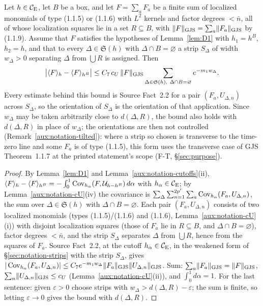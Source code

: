 \begin{auxlemma}\label{aux:constants-comparison}
Let $h\in\mathcal{C}_{\mathrm E}$, let $B$ be a box, and let $F=\sum_{a}F_a$ be a finite sum of localized
monomials of type (1.1.5) or (1.1.6) with $L^2$ kernels and factor degrees $<\bar n$, all of
whose localization squares lie in a set $R\subseteq B$, with $\lVert F\rVert_{\mathrm{GJS}}=\sum_a\lVert F_a\rVert_{\mathrm{GJS}}$ by
(1.1.9).  Assume that $F$ satisfies the hypotheses of Lemma~\ref{lem:D1} with $h_1=h^B$,
$h_2=h$, and that to every $\Delta\in\mathfrak S(h)$ with $\Delta\cap B=\varnothing$ a strip
$S_\Delta$ of width $w_\Delta>0$ separating $\Delta$ from $\bigcup R$ is assigned.  Then
\[
 \bigl|\ev Fh-\ev F{h^B}\bigr|\le C_7\,c_U\,\GJS F\sum_{\Delta\in\mathfrak S(h),\ \Delta\cap
 B=\varnothing}e^{-m_1w_\Delta} .
\]
Every estimate behind this bound is Source Fact~2.2 for a pair $(F_a,U_{\Delta,n})$ across
$S_\Delta$, so the orientation of $S_\Delta$ is the orientation of that application.  Since
$w_\Delta$ may be taken arbitrarily close to $d(\Delta,R)$, the bound also holds with
$d(\Delta,R)$ in place of $w_\Delta$; the orientations are then not controlled
(Remark~\ref{aux:notation-tilted}): where a strip so chosen is transverse to the time-zero line
and some $F_a$ is of type (1.1.5), this form uses the transverse case of GJS Theorem~1.1.7 at the
printed statement's scope (F-T, \S\ref{sec:purpose}).
\end{auxlemma}

\begin{proof}
By Lemma~\ref{lem:D1} and Lemma~\ref{aux:notation-cutoffs}(ii),
$\langle F\rangle_{h}-\langle F\rangle_{h^B}=-\int_0^1\operatorname{Cov}_{h_\alpha}(F,\mathcal U_{h-h^B})\,d\alpha$ with $h_\alpha\in\mathcal{C}_{\mathrm E}$; by
Lemma~\ref{aux:notation-cU}(iv) the covariance is
$\sum_{\Delta}\sum_{n=1}^{2p'}\sum_a\operatorname{Cov}_{h_\alpha}(F_a,U_{\Delta,n})$, the sum over
$\Delta\in\mathfrak S(h)$ with $\Delta\cap B=\varnothing$.  Each pair $(F_a,U_{\Delta,n})$
consists of two localized monomials (types (1.1.5)/(1.1.6) and (1.1.6),
Lemma~\ref{aux:notation-cU}(i)) with disjoint localization squares (those of $F_a$ lie in
$R\subseteq B$, and $\Delta\cap B=\varnothing$), factor degrees $<\bar n$, and the strip
$S_\Delta$ separates $\Delta$ from $\bigcup R$, hence from the squares of $F_a$.  Source
Fact~2.2, at the cutoff $h_\alpha\in\mathcal{C}_{\mathrm E}$, in the weakened form of \S\ref{sec:notation-strips}
with the strip $S_\Delta$, gives
$|\operatorname{Cov}_{h_\alpha}(F_a,U_{\Delta,n})|\le C_7e^{-m_1w_\Delta}\lVert F_a\rVert_{\mathrm{GJS}}\lVert U_{\Delta,n}\rVert_{\mathrm{GJS}}$.  Sum:
$\sum_a\lVert F_a\rVert_{\mathrm{GJS}}=\lVert F\rVert_{\mathrm{GJS}}$, $\sum_n\lVert U_{\Delta,n}\rVert_{\mathrm{GJS}}\le c_U$ (Lemma~\ref{aux:notation-cU}(ii)),
and $\int_0^1d\alpha=1$.  For the last sentence: given $\varepsilon>0$ choose strips with
$w_\Delta>d(\Delta,R)-\varepsilon$; the sum is finite, so letting $\varepsilon\to0$ gives the
bound with $d(\Delta,R)$.
\end{proof}

